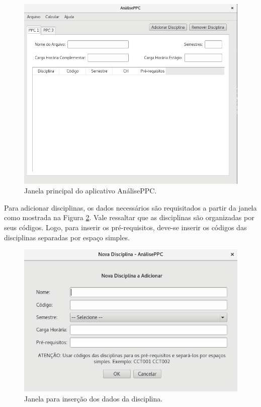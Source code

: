 \documentclass[a4paper, 12pt]{article}
\begin{document}
\begin{figure}[htb]
\centering
\includegraphics[scale=0.45]{main-window}
\caption{Janela principal do aplicativo AnálisePPC.}
\label{img:main-window}
\end{figure}

Para adicionar disciplinas, os dados necessários são requisitados a partir da janela como mostrada na Figura \ref{img:course-window}. Vale ressaltar que as 
disciplinas são organizadas por seus códigos. Logo, para inserir os pré-requisitos, deve-se inserir os códigos das disciplinas separadas por espaço simples. \\

\begin{figure}[h]
\centering
\includegraphics[scale=0.5]{course-window}
\caption{Janela para inserção dos dados da disciplina.}
\label{img:course-window}
\end{figure}
\end{document}
